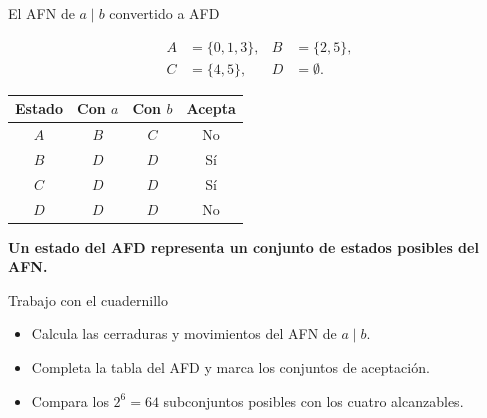\documentclass[11pt,spanish]{beamer}
\newcommand{\term}[1]{\textbf{\textcolor{indiagreen!80!black}{#1}}}
\newcommand{\actividad}[1]{\textbf{\textcolor{Rojo}{#1}}}
\begin{document}
\begin{frame}{El AFN de \(a\mid b\) convertido a AFD}
\vfill

\[
\begin{aligned}
A&=\{0,1,3\}, &
B&=\{2,5\},\\
C&=\{4,5\}, &
D&=\emptyset.
\end{aligned}
\]

\begin{center}
\small
\renewcommand{\arraystretch}{1.2}
\begin{tabular}{|c|c|c|c|}
\hline
\textbf{Estado} & \textbf{Con \(a\)} & \textbf{Con \(b\)} & \textbf{Acepta} \tabularnewline
\hline
\(A\) & \(B\) & \(C\) & No \tabularnewline
\hline
\(B\) & \(D\) & \(D\) & Sí \tabularnewline
\hline
\(C\) & \(D\) & \(D\) & Sí \tabularnewline
\hline
\(D\) & \(D\) & \(D\) & No \tabularnewline
\hline
\end{tabular}
\end{center}

\bigskip
\begin{center}
\term{Un estado del AFD representa un conjunto de estados posibles del AFN.}
\end{center}

\vfill
\end{frame}

\begin{frame}{Trabajo con el cuadernillo}
\vfill

\begin{center}
\end{center}

\bigskip
\begin{itemize}
\item Calcula las cerraduras y movimientos del AFN de \(a\mid b\).
\item Completa la tabla del AFD y marca los conjuntos de aceptación.
\item Compara los \(2^6=64\) subconjuntos posibles con los cuatro alcanzables.
\end{itemize}

\vfill
\end{frame}
\end{document}
